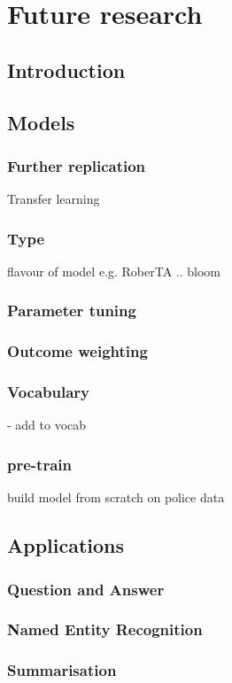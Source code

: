 \chapter{Future research }

\section{Introduction}


\section{Models}

\subsection{Further replication} Transfer learning
\subsection{Type} flavour of model e.g. RoberTA .. bloom
\subsection{Parameter tuning}
\subsection{Outcome weighting}
\subsection{Vocabulary} - add to vocab
\subsection{pre-train} build model from scratch on police data

\section{Applications}
\subsection{Question and Answer}
\subsection{Named Entity Recognition}
\subsection{Summarisation}
